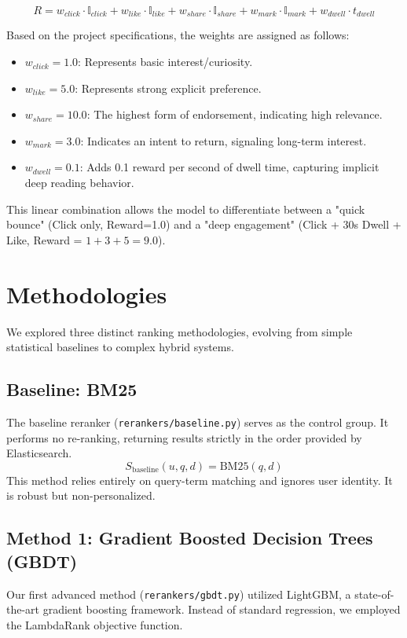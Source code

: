 \documentclass[11pt,a4paper]{article}
\begin{document}
\begin{equation}
R = w_{click} \cdot \mathbb{I}_{click} + w_{like} \cdot \mathbb{I}_{like} + w_{share} \cdot \mathbb{I}_{share} + w_{mark} \cdot \mathbb{I}_{mark} + w_{dwell} \cdot t_{dwell}
\end{equation}

Based on the project specifications, the weights are assigned as follows:
\begin{itemize}
    \item $w_{click} = 1.0$: Represents basic interest/curiosity.
    \item $w_{like} = 5.0$: Represents strong explicit preference.
    \item $w_{share} = 10.0$: The highest form of endorsement, indicating high relevance.
    \item $w_{mark} = 3.0$: Indicates an intent to return, signaling long-term interest.
    \item $w_{dwell} = 0.1$: Adds 0.1 reward per second of dwell time, capturing implicit deep reading behavior.
\end{itemize}

This linear combination allows the model to differentiate between a "quick bounce" (Click only, Reward=1.0) and a "deep engagement" (Click + 30s Dwell + Like, Reward = $1 + 3 + 5 = 9.0$).

\section{Methodologies}

We explored three distinct ranking methodologies, evolving from simple statistical baselines to complex hybrid systems.

\subsection{Baseline: BM25}
The baseline reranker (\texttt{rerankers/baseline.py}) serves as the control group. It performs no re-ranking, returning results strictly in the order provided by Elasticsearch.
$$ S_{\text{baseline}}(u, q, d) = \text{BM25}(q, d) $$
This method relies entirely on query-term matching and ignores user identity. It is robust but non-personalized.

\subsection{Method 1: Gradient Boosted Decision Trees (GBDT)}
Our first advanced method (\texttt{rerankers/gbdt.py}) utilized LightGBM, a state-of-the-art gradient boosting framework. Instead of standard regression, we employed the LambdaRank objective function.
\end{document}
